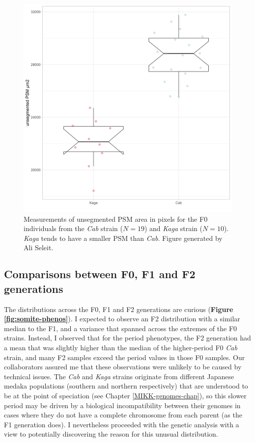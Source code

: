 \documentclass[
]{book}
\begin{document}
\begin{figure}
\includegraphics[width=1\linewidth]{figs/somites/ali_PSM_Cab_Kaga} \caption{Measurements of unsegmented PSM area in pixels for the F0 individuals from the \emph{Cab} strain (\(N = 19\)) and \emph{Kaga} strain (\(N = 10\)). \emph{Kaga} tends to have a smaller PSM than \emph{Cab}. Figure generated by Ali Seleit.}\label{fig:ali-psm-F0}
\end{figure}

\hypertarget{comparisons-between-f0-f1-and-f2-generations}{%
\subsection{Comparisons between F0, F1 and F2 generations}\label{comparisons-between-f0-f1-and-f2-generations}}

The distributions across the F0, F1 and F2 generations are curious (\textbf{Figure \ref{fig:somite-phenos}}). I expected to observe an F2 distribution with a similar median to the F1, and a variance that spanned across the extremes of the F0 strains. Instead, I observed that for the period phenotypes, the F2 generation had a mean that was slightly higher than the median of the higher-period F0 \emph{Cab} strain, and many F2 samples exceed the period values in those F0 samples. Our collaborators assured me that these observations were unlikely to be caused by technical issues. The \emph{Cab} and \emph{Kaga} strains originate from different Japanese medaka populations (southern and northern respectively) that are understood to be at the point of speciation (see Chapter \ref{MIKK-genomes-chap}), so this slower period may be driven by a biological incompatibility between their genomes in cases where they do not have a complete chromosome from each parent (as the F1 generation does). I nevertheless proceeded with the genetic analysis with a view to potentially discovering the reason for this unusual distribution.
\end{document}
